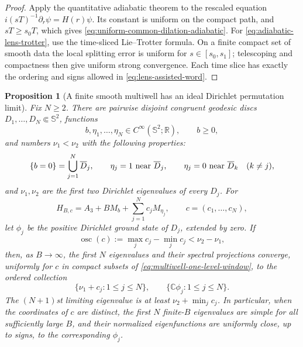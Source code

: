 \documentclass[11pt]{article}
\newtheorem{proposition}[theorem]{Proposition}
\theoremstyle{remark}
\begin{document}
\begin{proof}
Apply the quantitative adiabatic theorem to the rescaled equation
$i(sT)^{-1}\partial_r\psi=H(r)\psi$.  Its constant is uniform on the compact
path, and $sT\geq s_0T$, which gives
\eqref{eq:uniform-common-dilation-adiabatic}.  For
\eqref{eq:adiabatic-lens-trotter}, use the time-sliced Lie--Trotter formula.
On a finite compact set of smooth data the local splitting error is uniform
for $s\in[s_0,s_1]$; telescoping and compactness then give uniform strong
convergence.  Each time slice has exactly the ordering and signs allowed in
\eqref{eq:lens-assisted-word}.
\end{proof}

\begin{proposition}[A finite smooth multiwell has an ideal Dirichlet
permutation limit]
\label{prop:sphere-multiwell-spectral-limit}
Fix $N\geq2$.  There are pairwise disjoint congruent geodesic discs
$D_1,\ldots,D_N\Subset\mathbb S^2$, functions
\[
 b,\eta_1,\ldots,\eta_N\in C^\infty(\mathbb S^2;\mathbb R),
 \qquad b\geq0,
\]
and numbers $\nu_1<\nu_2$ with the following properties:
\[
 \{b=0\}=\bigcup_{j=1}^N\overline D_j,\qquad
 \eta_j=1\ \hbox{near }\overline D_j,\qquad
 \eta_j=0\ \hbox{near }\overline D_k\quad(k\neq j),
\]
and $\nu_1,\nu_2$ are the first two Dirichlet eigenvalues of every $D_j$.
For
\begin{equation}
 H_{B,c}=A_3+BM_b+\sum_{j=1}^Nc_jM_{\eta_j},
 \qquad c=(c_1,\ldots,c_N),
 \label{eq:sphere-multiwell-hamiltonian}
\end{equation}
let $\phi_j$ be the positive Dirichlet ground state of $D_j$, extended by
zero.  If
\begin{equation}
 \operatorname{osc}(c):=\max_jc_j-\min_jc_j<\nu_2-\nu_1,
 \label{eq:multiwell-one-level-window}
\end{equation}
then, as $B\to\infty$, the first $N$ eigenvalues and their spectral
projections converge, uniformly for $c$ in compact subsets of
\eqref{eq:multiwell-one-level-window}, to the ordered collection
\[
 \{\nu_1+c_j:1\leq j\leq N\},
 \qquad
 \{\mathbb C\phi_j:1\leq j\leq N\}.
\]
The $(N+1)$st limiting eigenvalue is at least
$\nu_2+\min_jc_j$.  In particular, when the coordinates of $c$ are
distinct, the first $N$ finite-$B$ eigenvalues are simple for all
sufficiently large $B$, and their normalized eigenfunctions are uniformly
close, up to signs, to the corresponding $\phi_j$.
\end{proposition}
\end{document}
